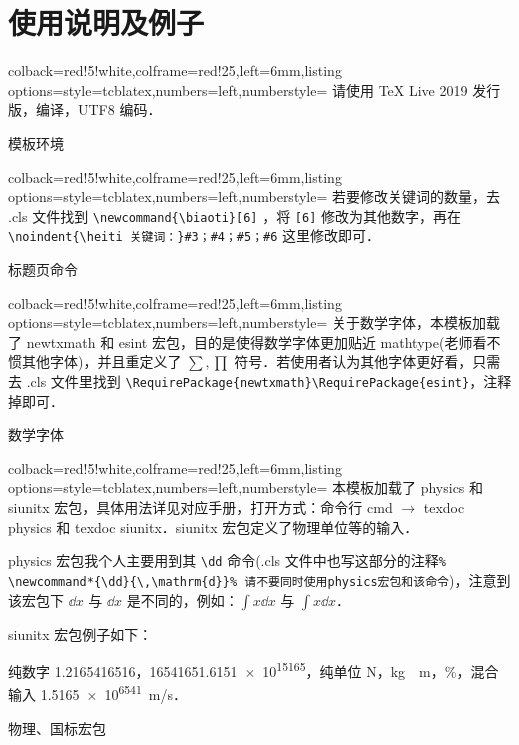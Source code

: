 \documentclass{JXUSTmodeling}
\begin{document}
    \section{使用说明及例子}\label{sec:5}
    \begin{example}[htbp]
        \centering
        \begin{tcblisting}{colback=red!5!white,colframe=red!25,left=6mm,listing options={style=tcblatex,numbers=left,numberstyle=\tiny\color{red!75!black}}}
请使用 TeX Live 2019 发行版，\XeLaTeX 编译，UTF8 编码．
    \end{tcblisting}
        \caption{模板环境}\label{exam:0}
    \end{example}

    \begin{example}[htbp]
        \centering
        \begin{tcblisting}{colback=red!5!white,colframe=red!25,left=6mm,listing options={style=tcblatex,numbers=left,numberstyle=\tiny\color{red!75!black}}}
若要修改关键词的数量，去 .cls 文件找到 \verb|\newcommand{\biaoti}[6]| ，将 \verb|[6]| 修改为其他数字，再在 \verb|\noindent{\heiti 关键词：}#3；#4；#5；#6| 这里修改即可．
\end{tcblisting}
        \caption{标题页命令}\label{exam:1}
    \end{example}

    \begin{example}[htbp]
        \centering
        \begin{tcblisting}{colback=red!5!white,colframe=red!25,left=6mm,listing options={style=tcblatex,numbers=left,numberstyle=\tiny\color{red!75!black}}}
关于数学字体，本模板加载了 newtxmath 和 esint 宏包，目的是使得数学字体更加贴近 mathtype(老师看不惯其他字体)，并且重定义了 $\sum,\prod$ 符号．若使用者认为其他字体更好看，只需去 .cls 文件里找到 \verb|\RequirePackage{newtxmath}\RequirePackage{esint}|，注释掉即可．
        \end{tcblisting}
        \caption{数学字体}\label{exam:2}
    \end{example}

    \begin{example}[htbp]
        \centering
        \begin{tcblisting}{colback=red!5!white,colframe=red!25,left=6mm,listing options={style=tcblatex,numbers=left,numberstyle=\tiny\color{red!75!black}}}
本模板加载了 physics 和 siunitx 宏包，具体用法详见对应手册，打开方式：命令行 cmd $\to$ texdoc physics 和 texdoc siunitx．siunitx 宏包定义了物理单位等的输入．

physics 宏包我个人主要用到其 \verb|\dd| 命令(.cls 文件中也写这部分的注释\verb|% \newcommand*{\dd}{\,\mathrm{d}}% 请不要同时使用physics宏包和该命令|)，注意到该宏包下 $\dd{x}$ 与 $\dd x$ 是不同的，例如：$\int x \dd{x}$ 与 $\int x \dd x$．

siunitx 宏包例子如下：

纯数字 \num{1.2165416516}，\num{16541651.6151e15165}，纯单位 \si{N}，\si{kg \cdot m}，\si{\percent}，混合输入 \SI{1.5165e6541}{m/s}．
\end{tcblisting}
        \caption{物理、国标宏包}\label{exam:3}
    \end{example}
\end{document}

